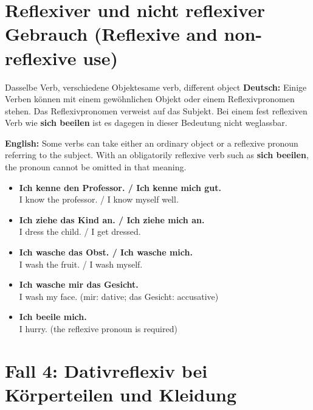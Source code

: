 \documentclass[a4paper,11pt]{article}
\newcommand{\GermanText}[1]{\textbf{Deutsch: }#1\par}
\newcommand{\EnglishText}[1]{{\small\color{SoftGray}\textbf{English: }#1\par}}
\newcommand{\ExampleItem}[2]{\item \textbf{#1}\\{\small\color{SoftGray}#2}}
\begin{document}
    

    \section{Reflexiver und nicht reflexiver Gebrauch (Reflexive and non-reflexive use)}
        \begin{grammarentry}{Dasselbe Verb, verschiedene Objekte}{same verb, different object}
            \GermanText{Einige Verben können mit einem gewöhnlichen Objekt oder einem Reflexivpronomen stehen. Das Reflexivpronomen verweist auf das Subjekt. Bei einem fest reflexiven Verb wie \textbf{sich beeilen} ist es dagegen in dieser Bedeutung nicht weglassbar.}
            \EnglishText{Some verbs can take either an ordinary object or a reflexive pronoun referring to the subject. With an obligatorily reflexive verb such as \textbf{sich beeilen}, the pronoun cannot be omitted in that meaning.}
            \begin{exbox}
                \begin{itemize}
                    \ExampleItem{Ich kenne den Professor. / Ich kenne mich gut.}{I know the professor. / I know myself well.}
                    \ExampleItem{Ich ziehe das Kind an. / Ich ziehe mich an.}{I dress the child. / I get dressed.}
                    \ExampleItem{Ich wasche das Obst. / Ich wasche mich.}{I wash the fruit. / I wash myself.}
                    \ExampleItem{Ich wasche mir das Gesicht.}{I wash my face. (mir: dative; das Gesicht: accusative)}
                    \ExampleItem{Ich beeile mich.}{I hurry. (the reflexive pronoun is required)}
                \end{itemize}
            \end{exbox}
        \end{grammarentry}

    \section{Fall 4: Dativreflexiv bei Körperteilen und Kleidung}
        
\end{document}
